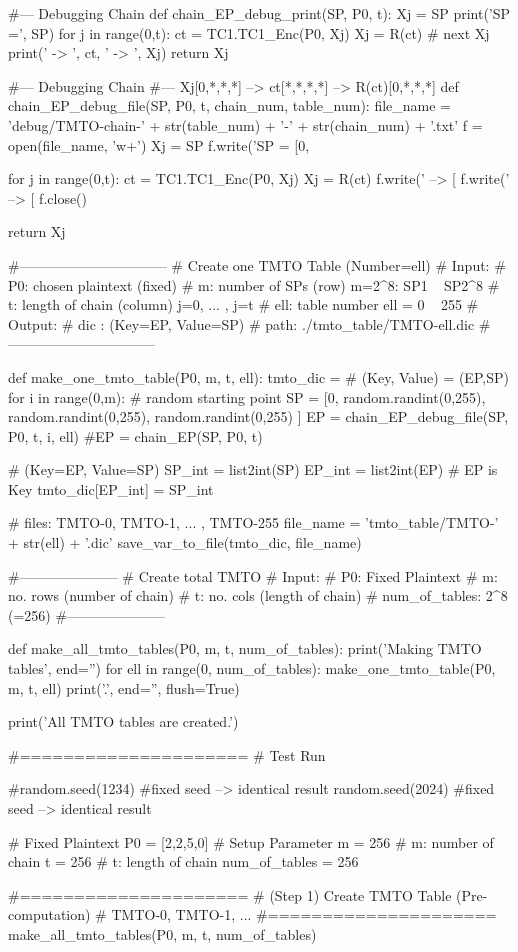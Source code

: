 \begin{python}
#--- Debugging Chain
def chain_EP_debug_print(SP, P0, t):
   Xj = SP
   print('SP =', SP)
   for j in range(0,t):
      ct = TC1.TC1_Enc(P0, Xj)
      Xj = R(ct)   # next Xj 
      print(' -> ', ct, ' -> ', Xj)
   return Xj

#--- Debugging Chain
#--- Xj[0,*,*,*] --> ct[*,*,*,*] --> R(ct)[0,*,*,*]
def chain_EP_debug_file(SP, P0, t, chain_num, table_num):
   file_name = 'debug/TMTO-chain-' + str(table_num) + '-' + str(chain_num) + '.txt'
   f = open(file_name, 'w+')
   Xj = SP
   f.write('SP = [0, %

   for j in range(0,t):
      ct = TC1.TC1_Enc(P0, Xj)
      Xj = R(ct)
      f.write(' --> [%
      f.write(' --> [%
   f.close()

   return Xj

#--------------------------------
# Create one TMTO Table (Number=ell)
# Input:
#      P0: chosen plaintext (fixed)
#       m: number of SPs (row)        m=2^8: SP1 ~ SP2^8
#       t: length of chain (column)   j=0, ... , j=t
#     ell: table number               ell = 0 ~ 255
# Output: 
#    dic : { (Key=EP, Value=SP) }    
#    path: ./tmto_table/TMTO-ell.dic
#--------------------------------

def make_one_tmto_table(P0, m, t, ell):
   tmto_dic = {}  # (Key, Value) = (EP,SP)
   for i in range(0,m):
      # random starting point
      SP = [0, random.randint(0,255), random.randint(0,255), random.randint(0,255) ]
      EP = chain_EP_debug_file(SP, P0, t, i, ell)
      #EP = chain_EP(SP, P0, t)  

      # { (Key=EP, Value=SP) }
      SP_int = list2int(SP)
      EP_int = list2int(EP)
      # EP is Key
      tmto_dic[EP_int] = SP_int

   # files: TMTO-0, TMTO-1, ... , TMTO-255
   file_name = 'tmto_table/TMTO-' + str(ell) + '.dic'
   save_var_to_file(tmto_dic, file_name)

#---------------------
# Create total TMTO
# Input:
#   P0: Fixed Plaintext 
#   m: no. rows (number of chain)
#   t: no. cols (length of chain)
#   num_of_tables: 2^8 (=256)
#---------------------
   
def make_all_tmto_tables(P0, m, t, num_of_tables):
   print('Making TMTO tables', end='')
   for ell in range(0, num_of_tables):
      make_one_tmto_table(P0, m, t, ell)
      print('.', end='', flush=True)

   print('\n All TMTO tables are created.')
   
#=====================
# Test Run

#random.seed(1234)  #fixed seed --> identical result
random.seed(2024)  #fixed seed --> identical result

# Fixed Plaintext
P0 = [2,2,5,0]
# Setup Parameter
m = 256             # m: number of chain
t = 256             # t: length of chain
num_of_tables = 256

#=====================
# (Step 1) Create TMTO Table (Pre-computation)
# TMTO-0, TMTO-1, ...
#=====================
make_all_tmto_tables(P0, m, t, num_of_tables)
\end{python}

